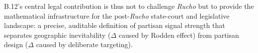 B.12's central legal contribution is thus not to challenge \emph{Rucho} but to
provide the mathematical infrastructure for the post-\emph{Rucho} state-court
and legislative landscape: a precise, auditable definition of partisan signal
strength that separates geographic inevitability ($\Delta$ caused by Rodden
effect) from partisan design ($\Delta$ caused by deliberate targeting).
